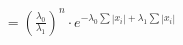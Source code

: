 \documentclass[preview]{standalone}
\begin{document}
\begin{align*}
= \left(\frac{\lambda_0}{\lambda_1}\right)^n \cdot e^{-\lambda_0\sum |x_i| + \lambda_1\sum |x_i|}
\end{align*}
\end{document}
